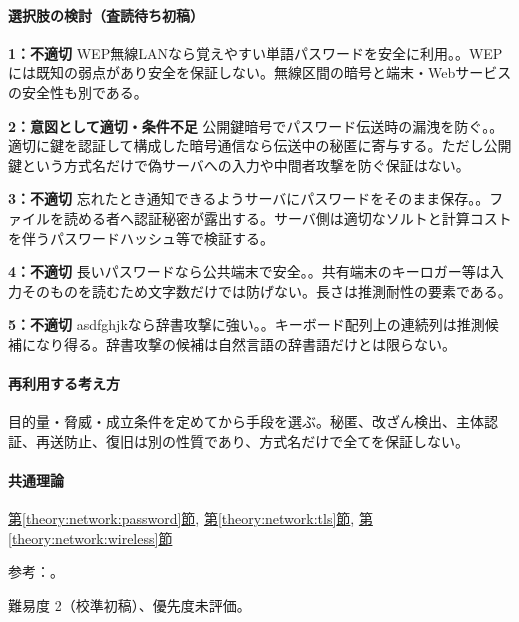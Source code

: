 \paragraph{選択肢の検討（査読待ち初稿）}\mbox{}\par

\noindent\textbf{1：不適切} WEP無線LANなら覚えやすい単語パスワードを安全に利用。。WEPには既知の弱点があり安全を保証しない。無線区間の暗号と端末・Webサービスの安全性も別である。\par

\noindent\textbf{2：意図として適切・条件不足} 公開鍵暗号でパスワード伝送時の漏洩を防ぐ。。適切に鍵を認証して構成した暗号通信なら伝送中の秘匿に寄与する。ただし公開鍵という方式名だけで偽サーバへの入力や中間者攻撃を防ぐ保証はない。\par

\noindent\textbf{3：不適切} 忘れたとき通知できるようサーバにパスワードをそのまま保存。。ファイルを読める者へ認証秘密が露出する。サーバ側は適切なソルトと計算コストを伴うパスワードハッシュ等で検証する。\par

\noindent\textbf{4：不適切} 長いパスワードなら公共端末で安全。。共有端末のキーロガー等は入力そのものを読むため文字数だけでは防げない。長さは推測耐性の要素である。\par

\noindent\textbf{5：不適切} asdfghjkなら辞書攻撃に強い。。キーボード配列上の連続列は推測候補になり得る。辞書攻撃の候補は自然言語の辞書語だけとは限らない。\par

\paragraph{再利用する考え方} 目的量・脅威・成立条件を定めてから手段を選ぶ。秘匿、改ざん検出、主体認証、再送防止、復旧は別の性質であり、方式名だけで全てを保証しない。

\paragraph{共通理論} \hyperref[theory:network:password]{第\ref*{theory:network:password}節}, \hyperref[theory:network:tls]{第\ref*{theory:network:tls}節}, \hyperref[theory:network:wireless]{第\ref*{theory:network:wireless}節}

\par 参考：\cite{net_nist2017,net_nist2025,net_wep}。

\par 難易度 2（校準初稿）、優先度未評価。

